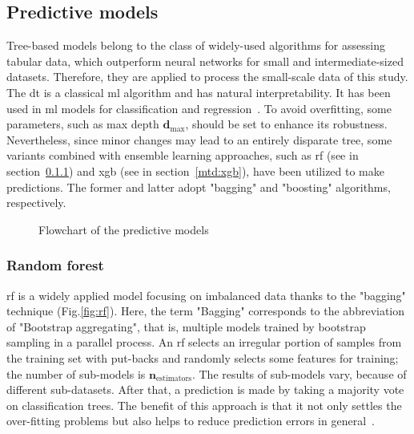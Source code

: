 \documentclass[twoside,twocolumn,9pt]{article}
\begin{document}
\subsection{Predictive models} \label{mtd:predictive}
Tree-based models belong to the class of widely-used algorithms for assessing tabular data, which outperform neural networks for small and intermediate-sized datasets\cite{grinsztajn2022tree}. Therefore, they are applied to process the small-scale data of this study.
%
The \acrfull*{dt} is a classical \acrshort*{ml} algorithm and has natural interpretability. It has been used in \acrshort*{ml} models for classification and regression~\cite{patel2018study,gong2022efficient}. To avoid overfitting, some parameters, such as max depth $\mathbf{d}_\textrm{max}$, should be set to enhance its robustness\cite{pal2003assessment}. Nevertheless, since minor changes may lead to an entirely disparate tree\cite{turney1995bias}, some variants combined with ensemble learning approaches, such as \acrshort*{rf} (see in section~\ref{mtd:rf}) and \acrlong*{xgb} (see in section~\ref{mtd:xgb}), have been utilized to make predictions. The former and latter adopt "bagging" and  "boosting" algorithms, respectively.

\begin{figure}[htb!]
    \centering
    \caption{Flowchart of the predictive models}
\end{figure}
\subsubsection{Random forest}\label{mtd:rf}
\acrshort*{rf} is a widely applied model focusing on imbalanced data thanks to the "bagging" technique\cite{ho1995random} (Fig.\ref{fig:rf}). Here, the term "Bagging" corresponds to the abbreviation of "Bootstrap aggregating", that is, multiple models trained by bootstrap sampling in a parallel process\cite{breiman1996bagging,cheng2022parameter}. An  \acrshort*{rf} selects an irregular portion of samples from the training set with put-backs and randomly selects some features for training; the number of sub-models is $\mathbf{n}_\textrm{estimators}$. The results of sub-models vary, because of different sub-datasets. After that, a prediction is made by taking a majority vote on classification trees. The benefit of this approach is that it not only settles the over-fitting problems but also helps to reduce prediction errors in general~\cite{breiman2001random}. 
%
%
\end{document}
